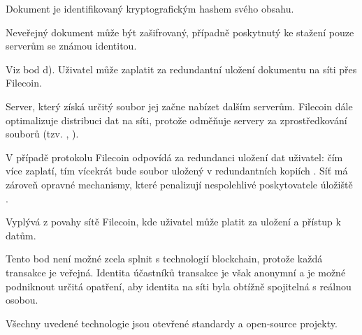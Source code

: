 \begin{enumerate}[a)]
Dokument je identifikovaný kryptografickým hashem svého obsahu.

Neveřejný dokument může být zašifrovaný, případně poskytnutý ke stažení pouze serverům se známou identitou.

Viz bod d). Uživatel může zaplatit za redundantní uložení dokumentu na síti přes Filecoin.

Server, který získá určitý soubor jej začne nabízet dalším serverům. Filecoin dále optimalizuje distribuci dat na síti, protože odměňuje servery za zprostředkování souborů (tzv. , \cite[viz][27]{Filecoin2017}).

V případě protokolu Filecoin odpovídá za redundanci uložení dat uživatel: čím více zaplatí, tím vícekrát bude soubor uložený v redundantních kopiích \autocite[18]{Filecoin2017}. Síť má zároveň opravné mechanismy, které penalizují nespolehlivé poskytovatele úložiště \autocite[20]{Filecoin2017}.

Vyplývá z povahy sítě Filecoin, kde uživatel může platit za uložení a přístup k datům.

Tento bod není možné zcela splnit s technologií blockchain, protože každá transakce je veřejná. Identita účastníků transakce je však anonymní a je možné podniknout určitá opatření, aby identita na síti byla obtížně spojitelná s reálnou osobou.

Všechny uvedené technologie jsou otevřené standardy a open-source projekty.

\end{enumerate}

